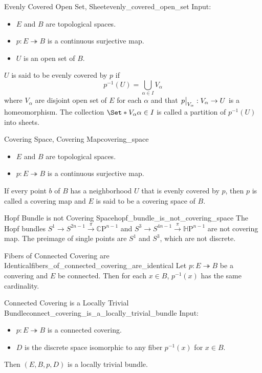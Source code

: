 \documentclass{article}
\begin{document}
\begin{definition}{Evenly Covered Open Set, Sheet}{evenly_covered_open_set}
    Input:
    \begin{itemize}
        \item $E$ and $B$ are topological spaces.
        \item $p:E\twoheadrightarrow B$ is a continuous surjective map.
        \item $U$ is an open set of $B$.
    \end{itemize}
    $U$ is said to be evenly covered by $p$ if
    \[ p^{-1}(U) = \bigcup_{\alpha\in I} V_\alpha \]
    where $V_\alpha$ are disjoint open set of $E$ for each $\alpha$ and that $\eval{p}_{V_\alpha}: V_\alpha\rightarrow U$ is a homeomorphism.
    The collection $\Set*{V_\alpha}{\alpha\in I}$ is called a partition of $p^{-1}(U)$ into sheets.
\end{definition}

\begin{definition}{Covering Space, Covering Map}{covering_space}
    \begin{itemize}
        \item $E$ and $B$ are topological spaces.
        \item $p:E\twoheadrightarrow B$ is a continuous surjective map.
    \end{itemize}
    If every point $b$ of $B$ has a neighborhood $U$ that is evenly covered by $p$, then $p$ is called a covering map and $E$ is said to be a covering space of $B$.
\end{definition}

\begin{example}{Hopf Bundle is not Covering Space}{hopf_bundle_is_not_covering_space}
    The Hopf bundles $S^1 \rightarrow S^{2n-1} \xrightarrow{\pi} \mathbb{C}\mathrm{P}^{n-1}$ and $S^3 \rightarrow S^{4n-1} \xrightarrow{\pi} \mathbb{H}\mathrm{P}^{n-1}$ are not covering map.
    The preimage of single points are $S^1$ and $S^3$, which are not discrete.
\end{example}

\begin{proposition}{Fibers of Connected Covering are Identical}{fibers_of_connected_covering_are_identical}
    Let $p:E\twoheadrightarrow B$ be a convering and $E$ be connected.
    Then for each $x\in B$, $p^{-1}(x)$ has the same cardinality.
\end{proposition}

\begin{theorem}{Connected Covering is a Locally Trivial Bundle}{connect_covering_is_a_locally_trivial_bundle}
    Input:
    \begin{itemize}
        \item $p:E\twoheadrightarrow B$ is a connected covering.
        \item $D$ is the discrete space isomorphic to any fiber $p^{-1}(x)$ for $x\in B$.
    \end{itemize}
    Then $(E,B,p,D)$ is a locally trivial bundle.
\end{theorem}
\end{document}
